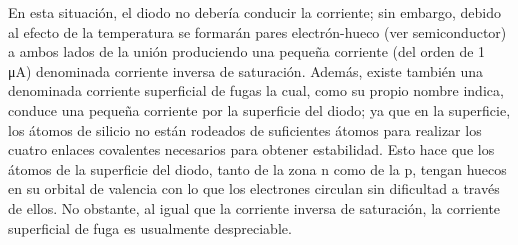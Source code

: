 En esta situación, el diodo no debería conducir la corriente; sin embargo, debido al efecto de la temperatura se formarán pares electrón-hueco (ver semiconductor) a ambos lados de la unión produciendo una pequeña corriente (del orden de 1 μA) denominada corriente inversa de saturación. Además, existe también una denominada corriente superficial de fugas la cual, como su propio nombre indica, conduce una pequeña corriente por la superficie del diodo; ya que en la superficie, los átomos de silicio no están rodeados de suficientes átomos para realizar los cuatro enlaces covalentes necesarios para obtener estabilidad. Esto hace que los átomos de la superficie del diodo, tanto de la zona n como de la p, tengan huecos en su orbital de valencia con lo que los electrones circulan sin dificultad a través de ellos. No obstante, al igual que la corriente inversa de saturación, la corriente superficial de fuga es usualmente despreciable.\citep{diodoWiki}\\






